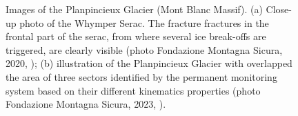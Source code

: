 \begin{figure}[ht!]
    \centering
    \caption{Images of the Planpincieux Glacier (Mont Blanc Massif). (a) Close-up photo of the Whymper Serac. The fracture fractures in the frontal part of the serac, from where several ice break-offs are triggered, are clearly visible (photo Fondazione Montagna Sicura, 2020, \citet{chiarle2023}); (b) illustration of the Planpincieux Glacier with overlapped the area of three sectors identified by the permanent monitoring system based on their different kinematics properties (photo Fondazione Montagna Sicura, 2023, \citet{Giordan2020a}).
    }
    \label{fig:1:planpincieux}
\end{figure}

